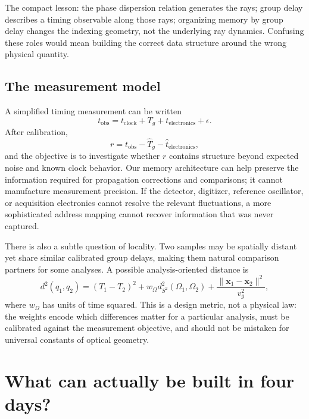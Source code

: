 \documentclass[11pt]{article}
\newcommand{\xv}{\mathbf{x}}
\begin{document}
The compact lesson: the phase dispersion relation generates the rays; group delay
describes a timing observable along those rays; organizing memory by group delay changes
the indexing geometry, not the underlying ray dynamics. Confusing these roles would mean
building the correct data structure around the wrong physical quantity.

\subsection{The measurement model}\label{sec:measurement}

A simplified timing measurement can be written~\cite{allan1966}
\begin{equation}
t_{\mathrm{obs}} = t_{\mathrm{clock}} + T_g + t_{\mathrm{electronics}} + \epsilon.
\end{equation}
After calibration,
\begin{equation}
r = t_{\mathrm{obs}} - \widehat{T}_g - \widehat{t}_{\mathrm{electronics}},
\end{equation}
and the objective is to investigate whether $r$ contains structure beyond expected noise
and known clock behavior. Our memory architecture can help preserve the information
required for propagation corrections and comparisons; it cannot manufacture measurement
precision. If the detector, digitizer, reference oscillator, or acquisition electronics
cannot resolve the relevant fluctuations, a more sophisticated address mapping cannot
recover information that was never captured.

There is also a subtle question of locality. Two samples may be spatially distant yet
share similar calibrated group delays, making them natural comparison partners for some
analyses. A possible analysis-oriented distance is
\begin{equation}
d^2(q_1,q_2) = (T_1 - T_2)^2 + w_\Omega d_{S^2}^2(\Omega_1,\Omega_2)
+ \frac{\|\xv_1-\xv_2\|^2}{v_g^2},
\end{equation}
where $w_\Omega$ has units of time squared. This is a design metric, not a physical law:
the weights encode which differences matter for a particular analysis, must be
calibrated against the measurement objective, and should not be mistaken for universal
constants of optical geometry.

\section{What can actually be built in four days?}\label{sec:fourdays}
\end{document}
